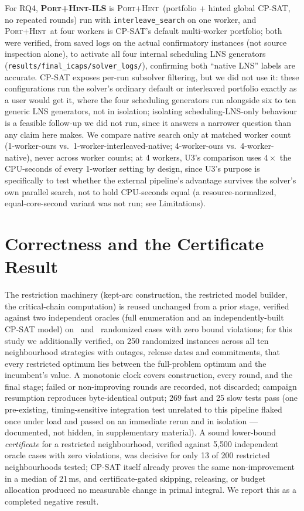 \documentclass[letterpaper]{article} %
\newcommand{\ph}{\textsc{Port+Hint}}
\newcommand{\native}{\textsc{Port+Hint-ILS}}
\begin{document}
For RQ4, \textbf{\native} is \ph\ (portfolio + hinted global CP-SAT, no repeated rounds) run with \texttt{interleave\_search} on one worker, and \ph\ at four workers is CP-SAT's default multi-worker portfolio; both were verified, from saved logs on the actual confirmatory instances (not source inspection alone), to activate all four internal scheduling LNS generators (\texttt{results/final\_icaps/solver\_logs/}), confirming both ``native LNS'' labels are accurate. CP-SAT exposes per-run subsolver filtering, but we did not use it: these configurations run the solver's ordinary default or interleaved portfolio exactly as a user would get it, where the four scheduling generators run alongside six to ten generic LNS generators, not in isolation; isolating scheduling-LNS-only behaviour is a feasible follow-up we did not run, since it answers a narrower question than any claim here makes. We compare native search only at matched worker count (1-worker-ours vs.\ 1-worker-interleaved-native; 4-worker-ours vs.\ 4-worker-native), never across worker counts; at 4 workers, U3's comparison uses $4\times$ the CPU-seconds of every 1-worker setting by design, since U3's purpose is specifically to test whether the external pipeline's advantage survives the solver's own parallel search, not to hold CPU-seconds equal (a resource-normalized, equal-core-second variant was not run; see Limitations).

\section{Correctness and the Certificate Result}
\label{sec:certificate}
\label{sec:verify}

The restriction machinery (kept-arc construction, the restricted model builder, the critical-chain computation) is reused unchanged from a prior stage, verified against two independent oracles (full enumeration and an independently-built CP-SAT model) on \OracleEnumCases\ and \OracleCpsatCases\ randomized cases with zero bound violations; for this study we additionally verified, on 250 randomized instances across all ten neighbourhood strategies with outages, release dates and commitments, that every restricted optimum lies between the full-problem optimum and the incumbent's value. A monotonic clock covers construction, every round, and the final stage; failed or non-improving rounds are recorded, not discarded; campaign resumption reproduces byte-identical output; 269 fast and 25 slow tests pass (one pre-existing, timing-sensitive integration test unrelated to this pipeline flaked once under load and passed on an immediate rerun and in isolation --- documented, not hidden, in supplementary material). A sound lower-bound \emph{certificate} for a restricted neighbourhood, verified against 5{,}500 independent oracle cases with zero violations, was decisive for only 13 of 200 restricted neighbourhoods tested; CP-SAT itself already proves the same non-improvement in a median of 21\,ms, and certificate-gated skipping, releasing, or budget allocation produced no measurable change in primal integral. We report this as a completed negative result.
\end{document}
